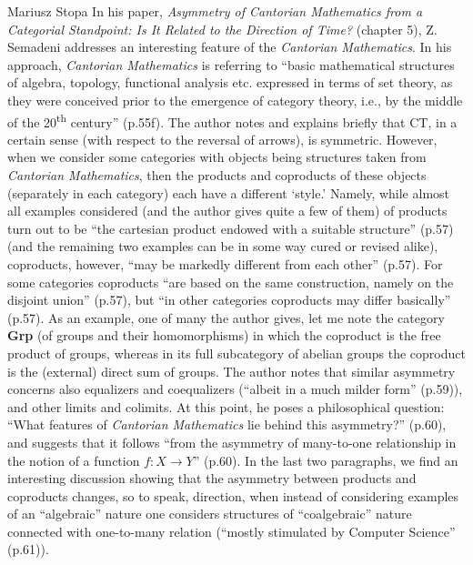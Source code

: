 \begin{recengenv}{Mariusz Stopa}
\enlargethispage{-.5\baselineskip}
In his paper, \textit{Asymmetry of Cantorian Mathematics from a Categorial Standpoint: Is It Related to the Direction of Time?} (chapter 5), Z. Semadeni addresses an interesting feature of the \textit{Cantorian Mathematics}. In his approach, \textit{Cantorian Mathematics} is referring to ``basic mathematical structures of algebra, topology, functional analysis etc. expressed in terms of set theory, as they were conceived prior to the emergence of cat\-e\-go\-ry theory, i.e., by the middle of the 20\textsuperscript{th} century'' (p.55f). The author notes and explains briefly that CT, in a certain sense (with respect to the reversal of arrows), is symmetric. However, when we consider some cat\-e\-gories with objects being structures taken from \textit{Cantorian Mathematics}, then the products and coproducts of these objects (separately in each cat\-e\-go\-ry) each have a different `style.' Namely, while almost all examples considered (and the author gives quite a few of them) of products turn out to be ``the cartesian product endowed with a suitable structure'' (p.57) (and the remaining two examples can be in some way cured or revised alike), coproducts, however, ``may be markedly different from each other'' (p.57). For some cat\-e\-gories coproducts ``are based on the same construction, namely on the disjoint union'' (p.57), but ``in other cat\-e\-gories coproducts may differ basically'' (p.57). As an example, one of many the author gives, let me note the cat\-e\-go\-ry \textbf{Grp} (of groups and their homomorphisms) in which the coproduct is the free product of groups, whereas in its full subcat\-e\-go\-ry of abelian groups the coproduct is the (external) direct sum of groups. The author notes that similar asymmetry concerns also equalizers and coequalizers (``albeit in a much milder form'' (p.59)), and other limits and colimits. At this point, he poses a philosophical question: ``What features of \textit{Cantorian Mathematics} lie behind this asymmetry?'' (p.60), and suggests that it follows ``from the asymmetry of many-to-one relationship in the notion of a function $ f:X\to Y $'' (p.60). In the last two paragraphs, we find an interesting discussion showing that the asymmetry between products and coproducts changes, so to speak, direction, when instead of considering examples of an ``algebraic'' nature one considers structures of ``coalgebraic'' nature connected with one-to-many relation (``mostly stimulated by Computer Science'' (p.61)).


\end{recengenv}
